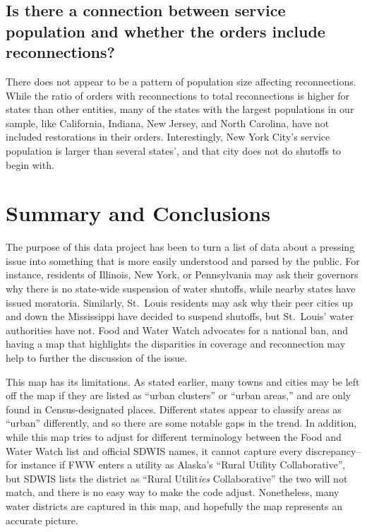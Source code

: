 \documentclass[
  12pt,
]{article}
\begin{document}
\hypertarget{is-there-a-connection-between-service-population-and-whether-the-orders-include-reconnections}{%
\subsection{Is there a connection between service population and whether
the orders include
reconnections?}\label{is-there-a-connection-between-service-population-and-whether-the-orders-include-reconnections}}

There does not appear to be a pattern of population size affecting
reconnections. While the ratio of orders with reconnections to total
reconnections is higher for states than other entities, many of the
states with the largest populations in our sample, like California,
Indiana, New Jersey, and North Carolina, have not included restorations
in their orders. Interestingly, New York City's service population is
larger than several states', and that city does not do shutoffs to begin
with.

\newpage

\hypertarget{summary-and-conclusions}{%
\section{Summary and Conclusions}\label{summary-and-conclusions}}

The purpose of this data project has been to turn a list of data about a
pressing issue into something that is more easily understood and parsed
by the public. For instance, residents of Illinois, New York, or
Pennsylvania may ask their governors why there is no state-wide
suspension of water shutoffs, while nearby states have issued moratoria.
Similarly, St.~Louis residents may ask why their peer cities up and down
the Mississippi have decided to suspend shutoffs, but St.~Louis' water
authorities have not. Food and Water Watch advocates for a national ban,
and having a map that highlights the disparities in coverage and
reconnection may help to further the discussion of the issue.

This map has its limitations. As stated earlier, many towns and cities
may be left off the map if they are listed as ``urban clusters'' or
``urban areas,'' and are only found in Census-designated places.
Different states appear to classify areas as ``urban'' differently, and
so there are some notable gaps in the trend. In addition, while this map
tries to adjust for different terminology between the Food and Water
Watch list and official SDWIS names, it cannot capture every
discrepancy-- for instance if FWW enters a utility as Alaska's ``Rural
Utility Collaborative'', but SDWIS lists the district as ``Rural
Utilit\emph{ies} Collaborative'' the two will not match, and there is no
easy way to make the code adjust. Nonetheless, many water districts are
captured in this map, and hopefully the map represents an accurate
picture.
\end{document}
